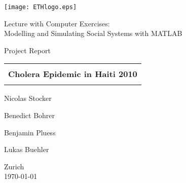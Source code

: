
\thispagestyle{empty}

\begin{center}
\texttt{[image: ETHlogo.eps]}

\bigskip


\bigskip


\bigskip


\LARGE{ 	Lecture with Computer Exercises:\\ }
\LARGE{ Modelling and Simulating Social Systems with MATLAB\\}

\bigskip

\bigskip

\small{Project Report}\\

\bigskip

\bigskip

\bigskip

\bigskip


\begin{tabular}{|c|}
\hline
\\
\textbf{\LARGE{Cholera Epidemic in Haiti 2010}}\\
\\
\hline
\end{tabular}
\bigskip

\bigskip

\bigskip

\LARGE{Nicolas Stocker 

Benedict Bohrer

Benjamin Pluess 

Lukas Buehler}



\bigskip

\bigskip

\bigskip

\bigskip

\bigskip

\bigskip

\bigskip

\bigskip

Zurich\\
\today\\
\end{center}


